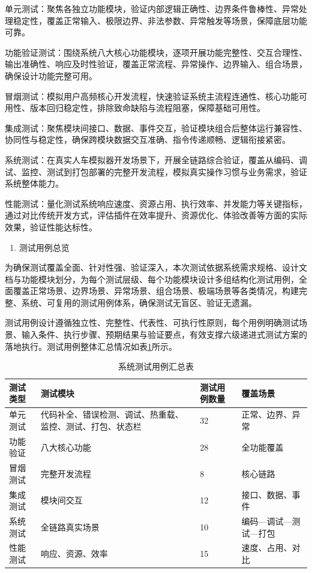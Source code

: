 单元测试：聚焦各独立功能模块，验证内部逻辑正确性、边界条件鲁棒性、异常处理稳定性，覆盖正常输入、极限边界、非法参数、异常触发等场景，保障底层功能可靠。

功能验证测试：围绕系统八大核心功能模块，逐项开展功能完整性、交互合理性、输出准确性、响应及时性验证，覆盖正常流程、异常操作、边界输入、组合场景，确保设计功能完整可用。

冒烟测试：模拟用户高频核心开发流程，快速验证系统主流程连通性、核心功能可用性、版本回归稳定性，排除致命缺陷与流程阻塞，保障基础可用性。

集成测试：聚焦模块间接口、数据、事件交互，验证模块组合后整体运行兼容性、协同性与稳定性，确保跨模块数据交互准确、指令传递顺畅、逻辑衔接紧密。

系统测试：在真实人车模拟器开发场景下，开展全链路综合验证，覆盖从编码、调试、监控、测试到打包部署的完整开发流程，模拟真实操作习惯与业务需求，验证系统整体能力。

性能测试：量化测试系统响应速度、资源占用、执行效率、并发能力等关键指标，通过对比传统开发方式，评估插件在效率提升、资源优化、体验改善等方面的实际效果，验证性能达标性。

\begin{enumerate}
\def\labelenumi{\arabic{enumi}.}
\setcounter{enumi}{1}
\item
  测试用例总览
\end{enumerate}

为确保测试覆盖全面、针对性强、验证深入，本次测试依据系统需求规格、设计文档与功能模块划分，为每个测试层级、每个功能模块设计多组结构化测试用例，全面覆盖正常场景、边界场景、异常场景、组合场景、极端场景等各类情况，构建完整、系统、可复用的测试用例体系，确保测试无盲区、验证无遗漏。

测试用例设计遵循独立性、完整性、代表性、可执行性原则，每个用例明确测试场景、输入条件、执行步骤、预期结果与验证要点，有效支撑六级递进式测试方案的落地执行。测试用例整体汇总情况如表\ref{tab:5-3}所示。

\begin{table}[H]
\centering
\caption{系统测试用例汇总表}
\label{tab:5-3}
\footnotesize
\renewcommand{\arraystretch}{1.18}
\begin{tabularx}{\textwidth}{p{}Xp{}p{}}
\toprule
测试类型 & 测试模块 & 测试用例数量 & 覆盖场景 \\
\midrule
单元测试 & 代码补全、错误检测、调试、热重载、监控、测试、打包、状态栏 & 32 & 正常、边界、异常 \\
功能验证 & 八大核心功能 & 28 & 全功能覆盖 \\
冒烟测试 & 完整开发流程 & 8 & 核心链路 \\
集成测试 & 模块间交互 & 12 & 接口、数据、事件 \\
系统测试 & 全链路真实场景 & 10 & 编码—调试—测试—打包 \\
性能测试 & 响应、资源、效率 & 15 & 速度、占用、对比 \\
\bottomrule
\end{tabularx}
\end{table}



